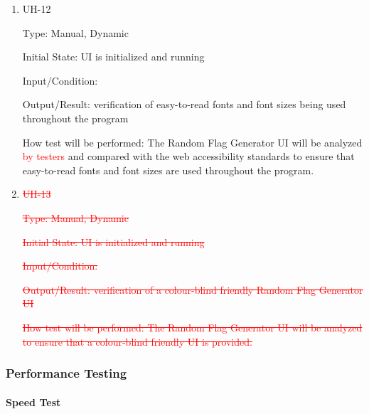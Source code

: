 \documentclass[12pt, titlepage]{article}
\begin{document}
\begin{enumerate}

\item{UH-12\\}

Type: Manual, Dynamic

Initial State: UI is initialized and running

Input/Condition:

Output/Result: verification of easy-to-read fonts and font sizes being used
throughout the program

How test will be performed: The Random Flag Generator UI will be analyzed
\textcolor{red}{by testers} and compared with the web accessibility standards
to ensure that easy-to-read fonts and font sizes are used throughout the
program.

\item{\textcolor{red}{\sout{UH-13}}\\}

\textcolor{red}{\sout{Type: Manual, Dynamic}}

\textcolor{red}{\sout{Initial State: UI is initialized and running}}

\textcolor{red}{\sout{Input/Condition:}}

\textcolor{red}{\sout{Output/Result: verification of a colour-blind friendly
Random Flag Generator UI}}

\textcolor{red}{\sout{How test will be performed: The Random Flag Generator UI
will be analyzed to ensure that a colour-blind friendly UI is provided.}}

\end{enumerate}

\subsubsection{Performance Testing}

\paragraph{Speed Test}
\end{document}
